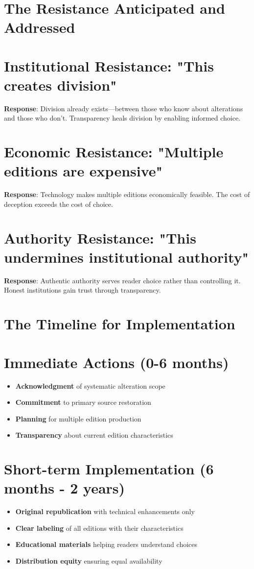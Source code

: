 \documentclass[11pt,twoside]{book}
\begin{document}
\section*{The Resistance Anticipated and Addressed}
\label{sec:org3fb2e55}

\section*{Institutional Resistance: "This creates division"}
\label{sec:orgd00c65b}
\textbf{\textbf{Response}}: Division already exists—between those who know about alterations and those who don't. Transparency heals division by enabling informed choice.
\section*{Economic Resistance: "Multiple editions are expensive"}
\label{sec:org80b95c1}
\textbf{\textbf{Response}}: Technology makes multiple editions economically feasible. The cost of deception exceeds the cost of choice.
\section*{Authority Resistance: "This undermines institutional authority"}
\label{sec:orga733140}
\textbf{\textbf{Response}}: Authentic authority serves reader choice rather than controlling it. Honest institutions gain trust through transparency.
\section*{The Timeline for Implementation}
\label{sec:orgde152f6}

\section*{Immediate Actions (0-6 months)}
\label{sec:orgc001492}
\begin{itemize}
\item \textbf{\textbf{Acknowledgment}} of systematic alteration scope
\item \textbf{\textbf{Commitment}} to primary source restoration
\item \textbf{\textbf{Planning}} for multiple edition production
\item \textbf{\textbf{Transparency}} about current edition characteristics
\end{itemize}
\section*{Short-term Implementation (6 months - 2 years)}
\label{sec:orgff79eda}
\begin{itemize}
\item \textbf{\textbf{Original republication}} with technical enhancements only
\item \textbf{\textbf{Clear labeling}} of all editions with their characteristics
\item \textbf{\textbf{Educational materials}} helping readers understand choices
\item \textbf{\textbf{Distribution equity}} ensuring equal availability
\end{itemize}
\end{document}
